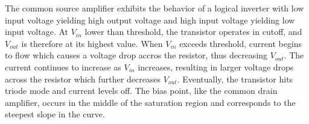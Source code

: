 The common source amplifier exhibits the behavior of a logical inverter with low input voltage yielding high output voltage and high input voltage yielding low input voltage. At $V_{in}$ lower than threshold, the transistor operates in cutoff, and $V_{out}$ is therefore at its highest value. When $V_{in}$ exceeds threshold, current begins to flow which causes a voltage drop accros the resistor, thus decreasing $V_{out}$. The current continues to increase as $V_{in}$ increases, resulting in larger voltage drops across the resistor which further decreases $V_{out}$. Eventually, the transistor hits triode mode and current levels off. The bias point, like the common drain amplifier, occurs in the middle of the saturation region and corresponds to the steepest slope in the curve.    
